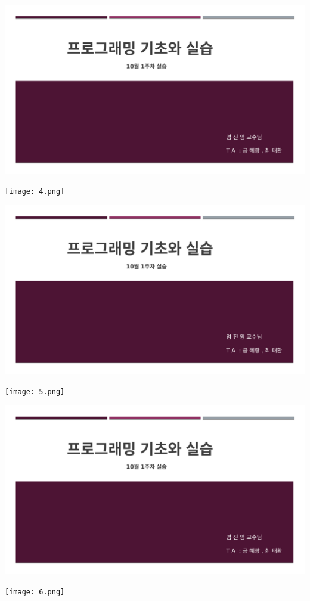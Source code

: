 \documentclass[11pt,a4paper]{article}
\begin{document}
\begin{enumerate}
\includegraphics[page=6, width=\textwidth]{1.pdf}
	
\texttt{[image: 4.png]}	


\includegraphics[page=7, width=\textwidth]{1.pdf}
	
\texttt{[image: 5.png]}	


\includegraphics[page=8, width=\textwidth]{1.pdf}

\texttt{[image: 6.png]}	
\end{enumerate}
\end{document}
